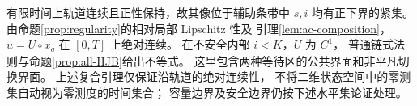 有限时间上轨道连续且正性保持，故其像位于辅助条带中
$s,i$ 均有正下界的紧集。
由命题\ref{prop:regularity}的相对局部 Lipschitz 性及
引理\ref{lem:ac-composition}，$u=U\circ x_q$ 在 $[0,T]$ 上绝对连续。
在不安全内部 $i<K$，$U$ 为 $C^1$，
普通链式法则与命题\ref{prop:all-HJB}给出不等式。
这里包含两种等待区的公共界面和非平凡切换界面。
上述复合引理仅保证沿轨道的绝对连续性，
不将二维状态空间中的零测集自动视为零测度的时间集合；
容量边界及安全边界仍按下述水平集论证处理。
